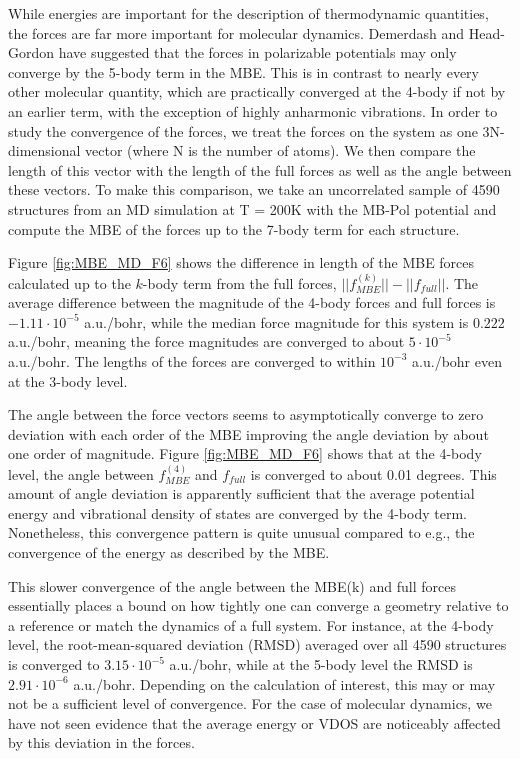 \documentclass[11pt, proquest]{uwthesis}[2020/02/24]
\let\ce\ch
\begin{document}
\par While energies are important for the description of thermodynamic quantities, the forces are far more important for molecular dynamics. Demerdash and Head-Gordon have suggested that the forces in polarizable potentials may only converge by the 5-body term in the MBE.\autocite{demerdash_assessing_2017} This is in contrast to nearly every other molecular quantity, which are practically converged at the 4-body if not by an earlier term,\autocite{bates_development_2011,medders_many-body_2013,xantheas_cooperativity_2000} with the exception of highly anharmonic vibrations.\autocite{heindel_origin_2018} In order to study the convergence of the forces, we treat the forces on the system as one 3N-dimensional vector (where N is the number of atoms). We then compare the length of this vector with the length of the full forces as well as the angle between these vectors. To make this comparison, we take an uncorrelated sample of 4590 structures from an MD simulation at T = 200K with the MB-Pol potential and compute the MBE of the forces up to the 7-body term for each structure.



\par Figure \ref{fig:MBE_MD_F6} shows the difference in length of the MBE forces calculated up to the $k$-body term from the full forces, $||f^{(k)}_{MBE}||-||f_{full}||$. The average difference between the magnitude of the 4-body forces and full forces is $-1.11\cdot 10^{-5}$ a.u./bohr, while the median force magnitude for this system is $0.222$ a.u./bohr, meaning the force magnitudes are converged to about $5\cdot 10^{-5}$ a.u./bohr. The lengths of the forces are converged to within $10^{-3}$ a.u./bohr even at the 3-body level.

\par The angle between the force vectors seems to asymptotically converge to zero deviation with each order of the MBE improving the angle deviation by about one order of magnitude. Figure \ref{fig:MBE_MD_F6} shows that at the 4-body level, the angle between $f^{(4)}_{MBE}$ and $f_{full}$ is converged to about 0.01 degrees. This amount of angle deviation is apparently sufficient that the average potential energy and vibrational density of states are converged by the 4-body term. Nonetheless, this convergence pattern is quite unusual compared to e.g., the convergence of the energy as described by the MBE.

\par This slower convergence of the angle between the MBE(k) and full forces essentially places a bound on how tightly one can converge a geometry relative to a reference or match the dynamics of a full system. For instance, at the 4-body level, the root-mean-squared deviation (RMSD) averaged over all 4590 \ce{(H2O)_{10}} structures is converged to $3.15\cdot 10^{-5}$ a.u./bohr, while at the 5-body level the RMSD is $2.91\cdot 10^{-6}$ a.u./bohr. Depending on the calculation of interest, this may or may not be a sufficient level of convergence. For the case of molecular dynamics, we have not seen evidence that the average energy or VDOS are noticeably affected by this deviation in the forces.
\end{document}
